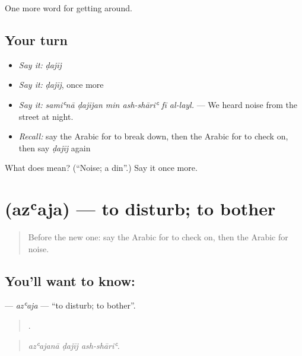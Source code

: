 \begin{grammarlens}[title={What you've built}]
One more word for getting around.
\end{grammarlens}

\subsection*{Your turn}
\begin{itemize}
\raggedright
  \item \emph{Say it:} \emph{ḍajīj}
  \item \emph{Say it:} \emph{ḍajīj}, once more
  \item \emph{Say it:} \emph{samiʿnā ḍajījan min ash-shāriʿ fī al-layl.} — We heard noise from the street at night.
  \item \emph{Recall:} say the Arabic for to break down, then the Arabic for to check on, then say \emph{ḍajīj} again
\end{itemize}

\begin{tcolorbox}[breakable,colback=teal!4,colframe=teal!35!black,title={Before you move on}]
What does  mean? (\textquotedblleft{}Noise; a din\textquotedblright{}.) Say it once more.
\end{tcolorbox}
\section[\texorpdfstring{\ar{أزعج} (azʿaja)}{أزعج (azʿaja)}]{ (azʿaja) — to disturb; to bother}

\label{lesson:AR-C448-azaja}



\begin{quote}
Before the new one: say the Arabic for to check on, then the Arabic for noise.
\end{quote}

\subsection*{You'll want to know: }
\textbf{} — \emph{azʿaja} — \textquotedblleft{}to disturb; to bother\textquotedblright{}.

\begin{quote}
  .
\end{quote}

\begin{quote}
\emph{azʿajanā ḍajīj ash-shāriʿ.}
\end{quote}

